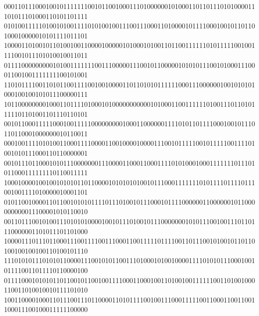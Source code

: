 \documentclass[10pt,\tflang,pdftex]{book}
\begin{document}
{{\begin{minipage}{\oldpwidth}
{{{{000110111000100101111111001011001000111010000001010001101101110101000011101011101000110101101111\blue\\
010100111110100101001111010100100111001110001101000010111100010010110110100010000010101111011101\\
100001101001011010010011000010000010100010100110110011111101011111001001111001011101010010011011\blue\\
011110000000001010011111110011100000111001011000001010101110010100011100011001001111111100101001\\
110101111001101011001111001001000011011010101111110001110000001001010101000100100101011100000111\blue\\
101100000000100011011110100010100000000000101000110011111101001110110101111101101001101110110101\\
001011000111110001001111100000000010001100000011110101101111000100101110110110001000000010110011\blue\\
000100111101010011000111100001100100001000011100101111100101111100111101001010111000110110000001\\
001011101100010101110000000111000011000110001111010100010001111111011101011000111111110110011111\blue\\
100010000100100101010110110000101010101001011100011111110101111011110111001001111010000010001101\\
010110010000110110010101011110111010010111000101111000000110000001011000000000011100001010110010\blue\\
001101110010100111010101000010010111010010111000000010101110010011101101110000001101011101101000\blue\\
100001110111011000111001111001110001100111110111100110111001010010110110100100100100110100101110\blue\\
111010101110101011000011100101011001110100010100100001111010101110001001011110011011110110000100\blue\\
011110001010101101100101100100111100011000100110100100111111001101001000110011010010010111101010\blue\\
100110000100011011100111011000011010111100100111000111110011000110011001100011100100011111100000\blue\\
}}}}
\end{minipage}}}
\end{document}
